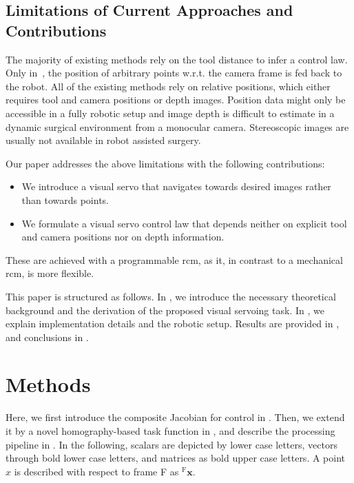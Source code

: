 
\subsection{Limitations of Current Approaches and Contributions}
The majority of existing methods rely on the tool distance to infer a control law. Only in~\cite{ma2019autonomous, ma2020visual, aghakhani2013task, yang2019adaptive, li2020accelerated, osa2010framework}, the position of arbitrary points w.r.t. the camera frame is fed back to the robot. All of the existing methods rely on relative positions, which either requires tool and camera positions or depth images. Position data might only be accessible in a fully robotic setup and image depth is difficult to estimate in a dynamic surgical environment from a monocular camera. Stereoscopic images are usually not available in robot assisted surgery.

Our paper addresses the above limitations with the following contributions:
\begin{itemize}
    \item We introduce a visual servo that navigates towards desired images rather than towards points.
    \item We formulate a visual servo control law that depends neither on explicit tool and camera positions nor on depth information.
\end{itemize} 
These are achieved with a programmable \gls{rcm}, as it, in contrast to a mechanical \gls{rcm}, is more flexible. 

This paper is structured as follows. In , we introduce the necessary theoretical background and the derivation of the proposed visual servoing task. In , we explain implementation details and the robotic setup. Results are provided in , and conclusions in .

\section{Methods}
\label{c2:sec:methods}
Here, we first introduce the composite Jacobian for control in . Then, we extend it by a novel homography-based task function in , and describe the processing pipeline in . In the following, scalars are depicted by lower case letters, vectors through bold lower case letters, and matrices as bold upper case letters. A point $x$ is described with respect to frame F as $^\text{F}\mathbf{x}$.

